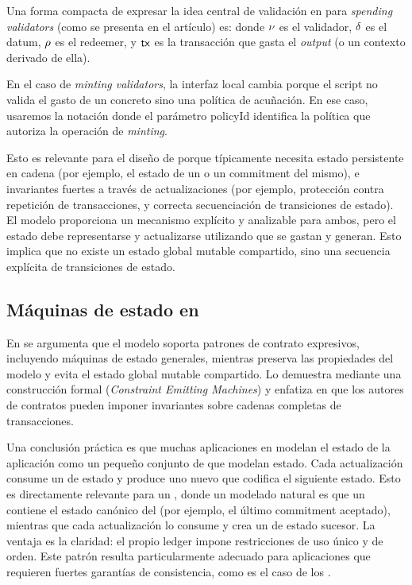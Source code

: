 Una forma compacta de expresar la idea central de validación en \eUTxO para \textit{spending validators} (como se presenta en el artículo) es: \SpendValidatorSchema donde $\nu$ es el validador, $\delta$ es el datum, $\rho$ es el redeemer, y $\mathsf{tx}$ es la transacción que gasta el \textit{output} (o un contexto derivado de ella).

En el caso de \textit{minting validators}, la interfaz local cambia porque el script no valida el gasto de un \UTxO concreto sino una política de acuñación. En ese caso, usaremos la notación \MintValidatorSchema donde el parámetro \textsf{policyId} identifica la política que autoriza la operación de \textit{minting}.

Esto es relevante para el diseño de \zkBridge porque típicamente necesita estado persistente en cadena (por ejemplo, el estado de un \LightClient o un commitment del mismo), e invariantes fuertes a través de actualizaciones (por ejemplo, protección contra repetición de transacciones, y correcta secuenciación de transiciones de estado). El modelo \eUTxO proporciona un mecanismo explícito y analizable para ambos, pero el estado debe representarse y actualizarse utilizando \UTxOs que se gastan y generan. Esto implica que no existe un estado global mutable compartido, sino una secuencia explícita de transiciones de estado.

\subsection{Máquinas de estado en \eUTxO}
\label{subsec:motivation-maquinas-de-estado-en-eutxo}

En \cite{Chakravarty2020} se argumenta que el modelo soporta patrones de contrato expresivos, incluyendo máquinas de estado generales, mientras preserva las propiedades del modelo \UTxO y evita el estado global mutable compartido. Lo demuestra mediante una construcción formal (\emph{Constraint Emitting Machines}) y enfatiza en que los autores de contratos pueden imponer invariantes sobre cadenas completas de transacciones.

Una conclusión práctica es que muchas aplicaciones en \Cardano modelan el estado de la aplicación como un pequeño conjunto de \UTxOs que modelan estado. Cada actualización consume un \UTxO de estado y produce uno nuevo que codifica el siguiente estado. Esto es directamente relevante para un \zkBridge, donde un modelado natural es que un \UTxO contiene el estado canónico del \Bridge (por ejemplo, el último commitment aceptado), mientras que cada actualización lo consume y crea un \UTxO de estado sucesor. La ventaja es la claridad: el propio ledger impone restricciones de uso único y de orden. Este patrón resulta particularmente adecuado para aplicaciones que requieren fuertes garantías de consistencia, como es el caso de los \Bridges.

